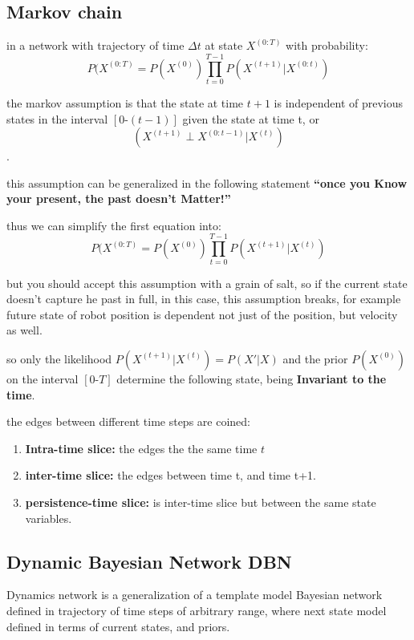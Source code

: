 \documentclass[4apaper,12pt]{book}
\begin{document}
\begin{description}
    \subsection{Markov chain}
    \begin{description}
    \item  in a network with trajectory of time $\Delta{t}$ at state $X^{(0:T)}$ with probability: $$P(X^{(0:T)}=P(X^{(0)})\prod_{t=0}^{T-1}P(X^{(t+1)}|X^{(0:t)})$$
    \item the markov assumption is that the state at time $t+1$ is independent of previous states in the interval $[0\text{-}(t-1)]$ given the state at time t, or $$(X^{(t+1)}\perp X^{(0:t-1)} | X^{(t)})$$.
    \item  this assumption can be generalized in the following statement \textbf{``once you Know your present, the past doesn't Matter!''}
    \item thus we can simplify the first equation into: $$P(X^{(0:T)}=P(X^{(0)})\prod_{t=0}^{T-1}P(X^{(t+1)}|X^{(t)})$$
    \item but you should accept this assumption with a grain of salt, so if the current state doesn't capture he past in full, in this case, this assumption breaks, for example future state of robot position is dependent not just of the position, but velocity as well.
    \item so only the likelihood $P(X^{(t+1)}|X^{(t)})=P(X'|X)$ and the prior $P(X^{(0)})$ on the interval $[0\text{-}T]$ determine the following state, being \textbf{Invariant to the time}.
    \item the edges between different time steps are coined:\begin{enumerate}
    \item \textbf{Intra-time slice: } the edges the the same time $t$
    \item \textbf{inter-time slice: } the edges between time t, and time t+1.
    \item \textbf{persistence-time slice: } is inter-time slice but between the same state variables.
    \end{enumerate}
      \subsection{Dynamic Bayesian Network DBN}
      \begin{description}
      \item Dynamics network is a generalization of a template model Bayesian network defined in trajectory of time steps of arbitrary range, where next state model defined in terms of current states, and priors.
      \end{description}
    \end{description}

\end{description}
\end{document}
